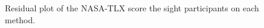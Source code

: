\begin{figure}[!htb]
\begin{minipage}{0.45\textwidth}
        \caption{Residual plot of the NASA-TLX score the sight participants on each method.}
        \label{fig:residplot_nasa_avg_two_way_sight}
    \end{minipage}
\end{figure}

\FloatBarrier